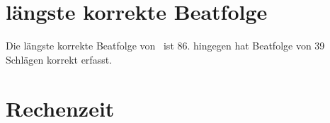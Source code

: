 \section{längste korrekte Beatfolge}
{
	Die längste korrekte Beatfolge von~\cite{2009_DaPlSt} ist \num{86}.
	\cite{2011_RoPlSt} hingegen hat Beatfolge von \num{39} Schlägen korrekt erfasst.
}

\section{Rechenzeit}
{
}
